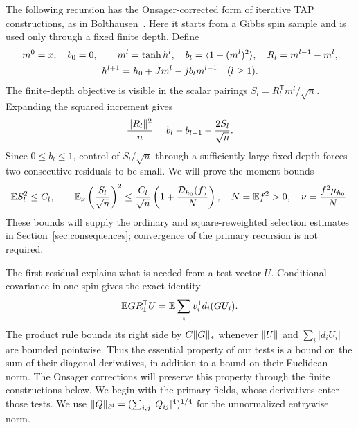 The following recursion has the Onsager-corrected form of iterative TAP
constructions, as in Bolthausen~\cite{Bolthausen2014}. Here it starts from
a Gibbs spin sample and is used only through a fixed finite depth.
Define
\begin{equation}
 \begin{gathered}
 m^0=x,\quad b_0=0,\qquad
 m^l=\tanh h^l,\quad b_l=\langle 1-(m^l)^2\rangle,\quad R_l=m^{l-1}-m^l,\\
 h^{l+1}=h_0+Jm^l-jb_lm^{l-1}\quad(l\geq1).
 \end{gathered}
 \label{eq:amp}
\end{equation}
The finite-depth objective is visible in the scalar pairings
$S_l=R_l^{\mathsf T}m^l/\sqrt n$. Expanding the squared increment gives
\begin{equation}\label{eq:residual-telescoping}
 \frac{\lVert R_l\rVert^2}{n}=b_l-b_{l-1}-\frac{2S_l}{\sqrt n}.
\end{equation}
Since $0\le b_l\le1$, control of $S_l/\sqrt n$ through a sufficiently
large fixed depth forces two consecutive residuals to be small. We will
prove the moment bounds
\[
 \mathbb E S_l^2\le C_l,\qquad
 \mathbb E_\nu\left(\frac{S_l}{\sqrt n}\right)^2
 \le\frac{C_l}{\sqrt n}\left(1+\frac{\mathcal D_{h_0}(f)}{N}\right),
 \quad N=\mathbb E f^2>0,\quad \nu=\frac{f^2\mu_{h_0}}{N}.
\]
These bounds will supply the ordinary and square-reweighted selection
estimates in Section~\ref{sec:consequences}; convergence of the primary
recursion is not required.

The first residual explains what is needed from a test vector $U$.
Conditional covariance in one spin gives the exact identity
\[
 \mathbb E G R_1^{\mathsf T}U=\mathbb E\sum_i v_i^1d_i(GU_i).
\]
The product rule bounds its right side by $C\lVert G\rVert_*$ whenever
$\lVert U\rVert$ and $\sum_i|d_iU_i|$ are bounded pointwise. Thus the essential
property of our tests is a bound on the sum of their diagonal derivatives,
in addition to a bound on their Euclidean norm. The Onsager corrections
will preserve this property through the finite constructions below.
We begin with the primary fields, whose derivatives enter those tests.
We use
$\lVert Q\rVert_{\ell^4}=(\sum_{i,j}|Q_{ij}|^4)^{1/4}$ for the unnormalized
entrywise norm.

